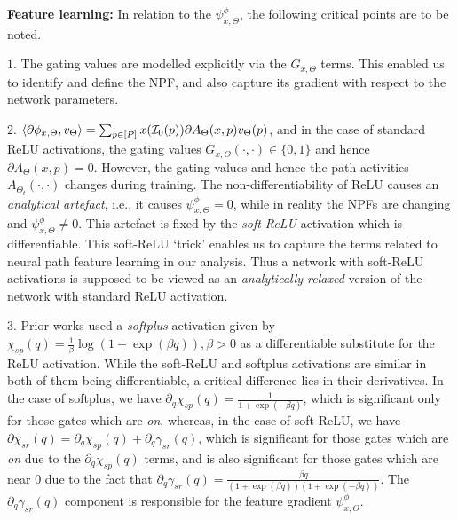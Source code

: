 \textbf{Feature learning:} In relation to the $\psi^{\phi}_{x,\Theta}$, the following critical points are to be noted.

$1.$ The gating values are modelled explicitly via the $G_{x,\Theta}$ terms. This enabled us to identify and define the NPF, and also capture its gradient with respect to the network parameters.

$2.$ $\langle \partial\phi_{x,\Theta},v_{\Theta}\rangle=\sum_{p\in [P]}x(\mathcal{I}_0(p)) \partial A_{\Theta}(x,p)v_{\Theta}(p)$, and in the case of standard ReLU activations, the gating values $G_{x,\Theta}(\cdot,\cdot)\in\{0,1\}$ and hence $\partial A_{\Theta}(x,p)=0$. However, the gating values and hence the path activities $A_{\Theta_t}(\cdot,\cdot)$ changes during training. The non-differentiability of ReLU causes an \emph{analytical artefact}, i.e., it causes  $\psi^{\phi}_{x,\Theta}=0$, while in reality the NPFs are changing and $\psi^{\phi}_{x,\Theta}\neq 0$. This artefact is fixed by the \emph{soft-ReLU} activation which is differentiable. This soft-ReLU `trick' enables us to capture the terms related to neural path feature learning in our analysis. Thus a network with soft-ReLU activations is supposed to be viewed as an \emph{analytically relaxed} version of the network with standard ReLU activation.

$3.$ Prior works used a \emph{softplus} activation given by $\chi_{sp}(q)=\frac{1}{\beta}\log(1+\exp(\beta q)),\beta>0$ as a differentiable substitute for the ReLU activation. While the soft-ReLU and softplus activations are similar in both of them being differentiable, a critical difference lies in their derivatives. In the case of softplus, we have $\partial_{q}\chi_{sp}(q)=\frac{1}{1+\exp(-\beta q)}$, which is significant only for those gates which are \emph{on}, whereas, in the case of soft-ReLU, we have $\partial{\chi}_{sr}(q)=\partial_q{\chi}_{sp}(q)+\partial_q{\gamma}_{sr}(q)$, which is significant for those gates which are \emph{on} due to the $\partial_q{\chi}_{sp}(q)$ terms, and is also significant for those gates which are near $0$ due to the fact that $\partial_q{\gamma}_{sr}(q)=\frac{\beta q}{(1+\exp(\beta q))(1+\exp(-\beta q))}$. The $\partial_q{\gamma}_{sr}(q)$ component is responsible for the feature gradient $\psi^{\phi}_{x,\Theta}$.


